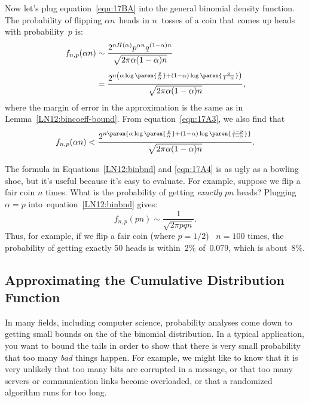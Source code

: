 \begin{editingnotes}
Now let's plug equation~\eqref{eqn:17BA} into the general binomial density
function.  The probability of flipping $\alpha n$~heads in $n$~tosses
of a coin that comes up heads with probability~$p$ is:
\begin{align}
f_{n, p}(\alpha n)
    &\sim \frac{ 2^{n H(\alpha)} p^{\alpha n} q^{(1 - \alpha)n} }
            { \sqrt{2 \pi \alpha (1 - \alpha) n} } \notag\\[4pt]
    &= \frac{ 2^{n \left(\alpha \log\paren{\frac{p}{\alpha}}
                    + (1 - \alpha) \log\paren{\frac{q}{1 - \alpha}}\right)} 
            }
            { \sqrt{2 \pi \alpha (1 - \alpha) n} }, \label{LN12:binbnd}
\end{align}
where the margin of error in the approximation is the same as in
Lemma~\ref{LN12:bincoeff-bound}.  From equation~\eqref{eqn:17A3}, we
also find that
\begin{equation}\label{eqn:17A4}
    f_{n, p}(\alpha n) < \frac{ 2^{n \paren{\alpha
        \log\paren{\frac{p}{\alpha}} + (1 - \alpha) \log\paren{\frac{1
          - p}{1 - \alpha}}}} }
                              { \sqrt{2 \pi \alpha (1 - \alpha) n} }.
\end{equation}

The formula in Equations~\ref{LN12:binbnd} and \ref{eqn:17A4} is as
ugly as a bowling shoe, but it's useful because it's easy to evaluate.
For example, suppose we flip a fair coin $n$ times.  What is the
probability of getting \emph{exactly} $pn$ heads?  Plugging $\alpha =
p$ into~equation~\eqref{LN12:binbnd} gives:
%
\begin{equation*}
f_{n, p}(pn)
    \sim \frac{1}{\sqrt{2 \pi p q n} }.
\end{equation*}
%
Thus, for example, if we flip a fair coin (where $p = 1/2$) \ $n =
100$ times, the probability of getting exactly 50 heads is within~2\%
of~$0.079$, which is about~8\%.

\subsection{Approximating the Cumulative Distribution Function}

In many fields, including computer science, probability analyses come
down to getting small bounds on the  of the binomial
distribution.  In a typical application, you want to bound the tails
in order to show that there is very small probability that too many
\emph{bad} things happen.  For example, we might like to know that it
is very unlikely that too many bits are corrupted in a message, or
that too many servers or communication links become overloaded, or
that a randomized algorithm runs for too long.


\end{editingnotes}
